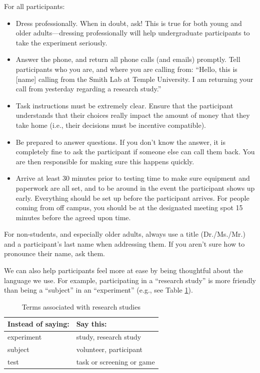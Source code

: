 \documentclass[letterpaper,11pt,oneside]{memoir}
\begin{document}
For all participants:

\begin{itemize}
\item Dress professionally. When in doubt, ask! This is true for both young and older adults---dressing professionally will help undergraduate participants to take the experiment seriously.
\item Answer the phone, and return all phone calls (and emails) promptly. Tell participants who you are, and where you are calling from: ``Hello, this is [name] calling from the Smith Lab at Temple University. I am returning your call from yesterday regarding a research study.''
\item Task instructions must be extremely clear. Ensure that the participant understands that their choices really impact the amount of money that they take home (i.e., their decisions must be incentive compatible). 
\item Be prepared to answer questions. If you don't know the answer, it is completely fine to ask the participant if someone else can call them back. You are then responsible for making sure this happens quickly.
\item Arrive at least 30 minutes prior to testing time to make sure equipment and paperwork are all set, and to be around in the event the participant shows up early. Everything should be set up before the participant arrives. For people coming from off campus, you should be at the designated meeting spot 15 minutes before the agreed upon time.
\end{itemize}
	
For non-students, and especially older adults, always use a title (Dr./Ms./Mr.) and a participant's last name when addressing them. If you aren't sure how to pronounce their name, ask them.

We can also help participants feel more at ease by being thoughtful about the language we use. For example, participating in a ``research study'' is more friendly than being a ``subject'' in an ``experiment'' (e.g., see Table \ref{table:terms}).

\begin{table}
\centering
\caption{Terms associated with research studies}
\begin{tabular}{ll}
\toprule
Instead of saying: & Say this:\\
\midrule
experiment& study, research study\\
subject& volunteer, participant\\
test & task or screening or game \\
\bottomrule
\end{tabular}
\label{table:terms}
\end{table}
\end{document}
